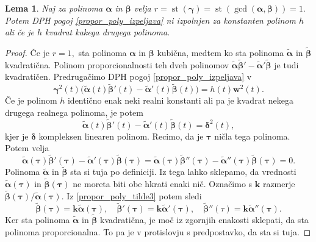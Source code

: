 \documentclass[12pt,a4paper,twoside]{article}
\theoremstyle{definition} %
\theoremstyle{plain} %
\newtheorem{lema}[definicija]{Lema}
\theoremstyle{primerstyle}
\numberwithin{equation}{section}  %
\newcommand{\kV}{\mathbf{k}}
\newcommand{\wV}{\mathbf{w}}
\newcommand{\balpha}{\boldsymbol \alpha}
\newcommand{\bbeta}{\boldsymbol \beta}
\newcommand{\bgamma}{\boldsymbol \gamma}
\newcommand{\bdelta}{\boldsymbol \delta}
\newcommand{\btau}{\boldsymbol \tau}
\newcommand{\btalpha}{\tilde{\boldsymbol \alpha}}
\newcommand{\btbeta}{\tilde{\boldsymbol \beta}}
\DeclareMathOperator{\st}{st}
\begin{document}
\begin{lema}
	\label{lema_2}
	Naj za polinoma $\balpha$ in $\bbeta$ velja $r=\st(\bgamma)=\st(\gcd(\balpha,\bbeta))=1.$ Potem DPH pogoj \eqref{propor_poly_izpeljava} ni izpolnjen za konstanten polinom $h$ ali če je $h$ kvadrat kakega drugega polinoma.
\end{lema}
\begin{proof}
	Če je $r=1,$ sta polinoma $\balpha$ in $\bbeta$ kubična, medtem ko sta polinoma $\btalpha$ in $\btbeta$ kvadratična. Polinom proporcionalnosti teh dveh polinomov $\btalpha\btbeta'-\btalpha'\btbeta$ je tudi kvadratičen. Predrugačimo DPH pogoj \eqref{propor_poly_izpeljava} v
	\begin{equation}
		\label{propor_poly_tilde}
		\bgamma^2(t)\big(\btalpha(t)\btbeta'(t)-\btalpha'(t)\btbeta(t)\big)=h(t)\wV^2(t).
	\end{equation}
	Če je polinom $h$ identično enak neki realni konstanti ali pa je kvadrat nekega drugega realnega polinoma, je potem
	\begin{equation}
		\label{propor_poly_tilde2}
		\btalpha(t)\btbeta'(t)-\btalpha'(t)\btbeta(t)=\bdelta^2(t),
	\end{equation}
	kjer je $\bdelta$ kompleksen linearen polinom. Recimo, da je $\btau$ ničla tega polinoma. Potem velja
	\begin{equation}
		\label{propor_poly_tilde3}
		\btalpha(\btau)\btbeta'(\btau)-\btalpha'(\btau)\btbeta(\btau)=\btalpha(\btau)\btbeta''(\btau)-\btalpha''(\btau)\btbeta(\btau)=0.
	\end{equation}
	Polinoma $\btalpha$ in $\btbeta$ sta si tuja po definiciji. Iz tega lahko sklepamo, da vrednosti $\btalpha(\btau)$ in $\btbeta(\btau)$ ne moreta biti obe hkrati enaki nič. Označimo s $\kV$ razmerje $\btbeta(\btau)/\btalpha(\btau).$ Iz \eqref{propor_poly_tilde3} potem sledi
	\begin{equation}
		\btbeta(\btau)=\kV\btalpha(\btau),\quad\btbeta'(\btau)=\kV\btalpha'(\btau),\quad\btbeta''(\tau)=\kV\btalpha''(\btau).
	\end{equation}
	Ker sta polinoma $\btalpha$ in $\btbeta$ kvadratična, je moč iz zgornjih enakosti sklepati, da sta polinoma proporcionalna. To pa je v protislovju s predpostavko, da sta si tuja.
	

\end{proof}
\end{document}

